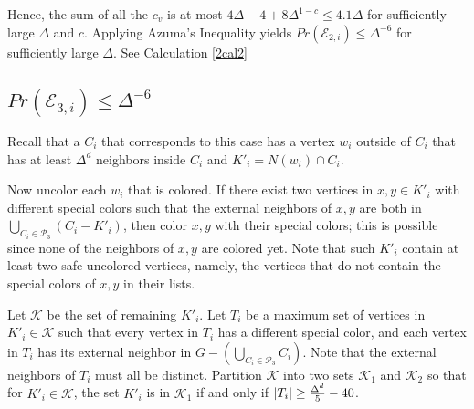 \documentclass[12pt]{article}
\theoremstyle{definition}
\begin{document}
Hence, the sum of all the $c_v$ is at most $4\Delta -4 + 8\Delta^{1-c}\leq 4.1\Delta$ for sufficiently large $\Delta$ and $c$. Applying Azuma's Inequality yields $Pr(\mathcal{E}_{2, i})\leq \Delta^{-6}$ for sufficiently large $\Delta$. See Calculation \ref{2cal2}

\subsection{$Pr(\mathcal{E}_{3,i})\leq \Delta^{-6}$}

Recall that a $C_i$ that corresponds to this case has a vertex $w_i$ outside of $C_i$ that has at least $\Delta^d$ neighbors inside $C_i$ and $K'_i=N(w_i)\cap C_i$. 

Now uncolor each $w_i$ that is colored.
If there exist two vertices in $x, y\in K'_i$ with different special colors such that the external neighbors of $x, y$ are both in $\bigcup_{C_i\in\mathcal{P}_3} (C_i-K'_i)$, then color $x, y$ with their special colors; 
this is possible since none of the neighbors of $x,y$ are colored yet.
Note that such $K'_i$ contain at least two safe uncolored vertices, namely, the vertices that do not contain the special colors of $x,y$ in their lists. 

Let $\mathcal{K}$ be the set of remaining $K'_i$. 
Let $T_i$ be a maximum set of vertices in $K'_i\in \mathcal{K}$ such that every vertex in $T_i$ has a different special color, and each vertex in $T_i$ has its external neighbor in $G-\left(\bigcup_{C_i\in\mathcal{P}_3}C_i\right)$. 
Note that the external neighbors of $T_i$ must all be distinct. 
Partition $\mathcal{K}$ into two sets $\mathcal{K}_1$ and $\mathcal{K}_2$ so that for $K'_i\in\mathcal{K}$, the set $K'_i$ is in $\mathcal{K}_1$ if and only if $|T_i|\geq{\Delta^d\over 5}-40$.
\end{document}

